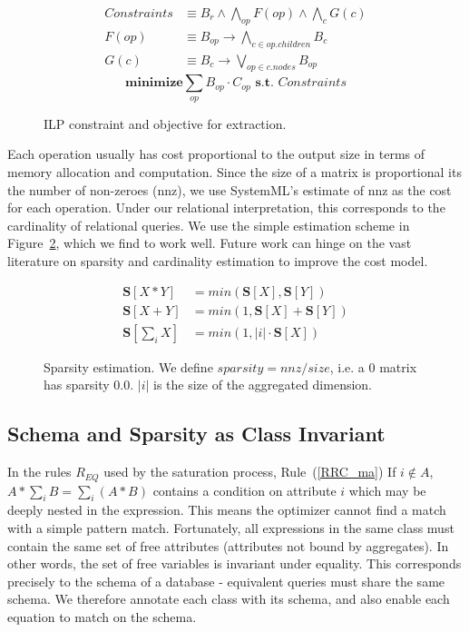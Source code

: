 \begin{figure}
    \begin{align*}
Constraints &\equiv B_r \wedge \bigwedge_{op} F(op) \wedge \bigwedge_c G(c)
\\ F(op) &\equiv B_{op} \rightarrow \bigwedge_{c \in op.children} B_c \\ G(c)
&\equiv B_c \rightarrow \bigvee_{op \in c.nodes} B_{op}
\end{align*}
\[\textbf{minimize} \sum_{op} B_{op} \cdot C_{op} \textbf{ s.t. } Constraints\]

    \caption{ILP constraint and objective for extraction. }
    \label{ilp}
\end{figure}

Each operation usually has cost proportional to the output size in terms of
memory allocation and computation. Since the size of a matrix is proportional
its the number of non-zeroes (nnz), we use SystemML's estimate of nnz as the
cost for each operation. Under our relational interpretation, this corresponds
to the cardinality of relational queries. We use the simple estimation scheme in
Figure~\ref{fig:cost}, which we find to work well. Future work can hinge on the
vast literature on sparsity and cardinality estimation to improve the cost
model.

\begin{figure}
\begin{align*}
    \textbf{S}[X*Y] &= min(\textbf{S}[X], \textbf{S}[Y]) \\ \textbf{S}[X+Y] &=
    min(1, \textbf{S}[X]+\textbf{S}[Y]) \\ \textbf{S}[\sum_i X] &= min(1, |i|
    \cdot \textbf{S}[X])
\end{align*}
    \caption[Sparsity estimation]{Sparsity estimation. We define $sparsity = nnz
      / size$, i.e. a 0 matrix has sparsity $0.0$\protect\footnotemark. $|i|$ is
      the size of the aggregated dimension. }
    \label{fig:cost}
\end{figure}

\subsection{Schema and Sparsity as Class Invariant}
In the rules $R_{EQ}$ used by the saturation process, Rule~(\ref{RRC_ma}) If $i
\not\in A$, $A * \sum_i B = \sum_i (A * B)$ contains a condition on attribute
$i$ which may be deeply nested in the expression. This means the optimizer
cannot find a match with a simple pattern match. Fortunately, all expressions in
the same class must contain the same set of free attributes (attributes not
bound by aggregates). In other words, the set of free variables is invariant
under equality. This corresponds precisely to the schema of a database -
equivalent queries must share the same schema. We therefore annotate each class
with its schema, and also enable each equation to match on the schema.


